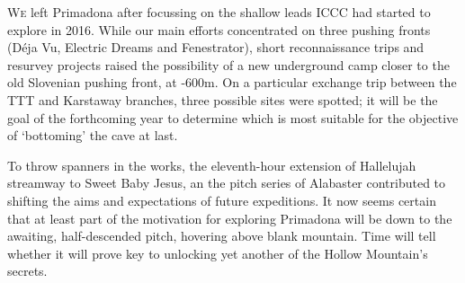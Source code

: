 \newpage
 \thispagestyle{endchapter}
\begin{tcolorbox}
	\vspace{80pt}
	\lettrine{W}{e} left Primadona after focussing on the shallow leads ICCC had started to explore in 2016. While our main efforts concentrated on three pushing fronts (Déja Vu, Electric Dreams and Fenestrator), short reconnaissance trips and resurvey projects raised the possibility of a new underground camp closer to the old Slovenian pushing front, at -600m. On a particular exchange trip between the TTT and Karstaway branches, three possible sites were spotted; it will be the goal of the forthcoming year to determine which is most suitable for the objective of `bottoming' the cave at last. 

	To throw spanners in the works, the eleventh-hour extension of Hallelujah streamway to Sweet Baby Jesus, an the pitch series of Alabaster contributed to shifting the aims and expectations of future expeditions. It now seems certain that at least part of the motivation for exploring Primadona will be down to the awaiting, half-descended pitch, hovering above blank mountain. Time will tell whether it will prove key to unlocking yet another of the Hollow Mountain's secrets.

\end{tcolorbox}

\BgThispage

